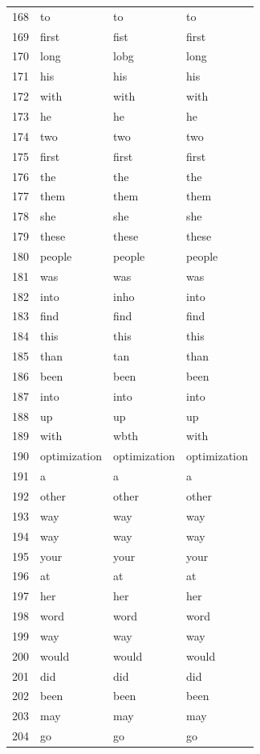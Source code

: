 \begin{longtable}{clll}
    168 & to & to & to \\
    169 & first & fist & first \\
    170 & long & lobg & long \\
    171 & his & his & his \\
    172 & with & with & with \\
    173 & he & he & he \\
    174 & two & two & two \\
    175 & first & first & first \\
    176 & the & the & the \\
    177 & them & them & them \\
    178 & she & she & she \\
    179 & these & these & these \\
    180 & people & people & people \\
    181 & was & was & was \\
    182 & into & inho & into \\
    183 & find & find & find \\
    184 & this & this & this \\
    185 & than & tan & than \\
    186 & been & been & been \\
    187 & into & into & into \\
    188 & up & up & up \\
    189 & with & wbth & with \\
    190 & optimization & optimization & optimization \\
    191 & a & a & a \\
    192 & other & other & other \\
    193 & way & way & way \\
    194 & way & way & way \\
    195 & your & your & your \\
    196 & at & at & at \\
    197 & her & her & her \\
    198 & word & word & word \\
    199 & way & way & way \\
    200 & would & would & would \\
    201 & did & did & did \\
    202 & been & been & been \\
    203 & may & may & may \\
    204 & go & go & go \\

\end{longtable}
